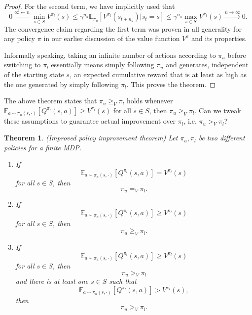 \documentclass[11pt]{article} %
\newtheorem{thm}{Theorem}
\begin{document}
\begin{proof}
	For the second term, we have implicitly used that $$0 \overset{\infty \leftarrow n}{\leftarrow} \min_{s \in S} V^{\pi_l}(s) \le \gamma^{n_a}\mathbb{E}_{\pi_u}[V^{\pi_l}(s_{t+n_a}) | s_t = s] \le \gamma^{n_a} \max_{s \in S} V^{\pi_l}(s) \overset{n \rightarrow \infty}{\rightarrow} 0.$$ The convergence claim regarding the first term was proven in all generality for any policy $\pi$ in our earlier discussion of the value function $V^{\pi}$ and its properties.

Informally speaking, taking an infinite number of actions according to $\pi_u$ before switching to $\pi_l$ essentially means simply following $\pi_u$ and generates, independent of the starting state $s$, an expected cumulative reward that is at least as high as the one generated by simply following $\pi_l$. This proves the theorem.

\end{proof}

The above theorem states that $\pi_u \ge_V \pi_l$ holds whenever $ \mathbb{E}_{a \sim \pi_u(s,\cdot )}[Q^{\pi_l}(s,a)] \ge V^{\pi_l}(s)$ for all $s \in S$, then $\pi_u \ge_V \pi_l.$ Can we tweak these assumptions to guarantee actual improvement over $\pi_l$, i.e. $\pi_u >_V \pi_l$?

\begin{thm}{(Improved policy improvement theorem)}
	Let $\pi_u, \pi_l$ be two different policies for a finite MDP.
	\begin{enumerate}
		\item If $$ \mathbb{E}_{a \sim \pi_u(s,\cdot )}[Q^{\pi_l}(s,a)] = V^{\pi_l}(s)$$ for all $s \in S$, then $$\pi_u =_V \pi_l.$$
		\item If $$ \mathbb{E}_{a \sim \pi_u(s,\cdot )}[Q^{\pi_l}(s,a)] \ge V^{\pi_l}(s)$$ for all $s \in S$, then $$\pi_u \ge_V \pi_l.$$
		\item If $$ \mathbb{E}_{a \sim \pi_u(s,\cdot )}[Q^{\pi_l}(s,a)] \ge V^{\pi_l}(s)$$ for all $s \in S$, then $$\pi_u >_V \pi_l$$ and there is at least one $s \in S$ such that $$ \mathbb{E}_{a \sim \pi_u(s,\cdot )}[Q^{\pi_l}(s,a)] > V^{\pi_l}(s),$$ then $$\pi_u >_V \pi_l.$$
	\end{enumerate}
\end{thm}
\end{document}
